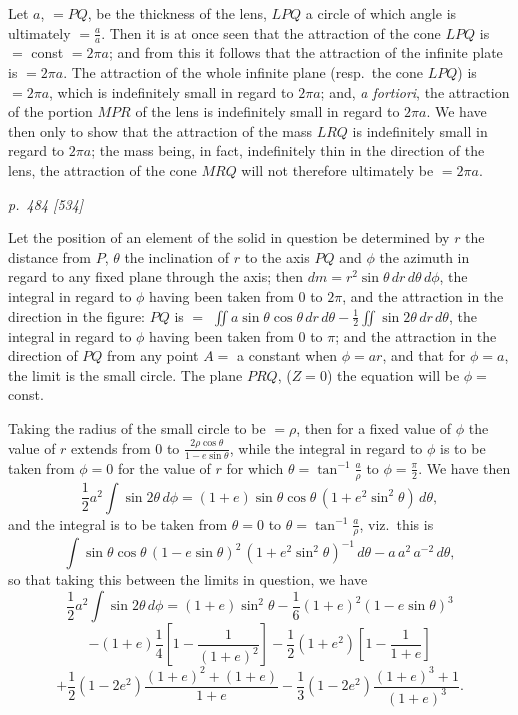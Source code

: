 \documentclass[11pt,a4paper]{book}
\begin{document}
Let $a$, $=PQ$, be the thickness of the lens, $LPQ$ a circle of which angle is ultimately
$=\frac{a}{a}$. Then it is at once seen that the attraction of the cone $LPQ$ is $=$ const $= 2\pi a$;
and from this it follows that the attraction of the infinite plate is $=2\pi a$. The
attraction of the whole infinite plane (resp.\ the cone $LPQ$) is $=2\pi a$, which is
indefinitely small in regard to $2\pi a$; and, \textit{a fortiori}, the attraction of the portion $MPR$
of the lens is indefinitely small in regard to $2\pi a$. We have then only to show that
the attraction of the mass $LRQ$ is indefinitely small in regard to $2\pi a$; the mass being,
in fact, indefinitely thin in the direction of the lens, the attraction of the cone $MRQ$
will not therefore ultimately be $=2\pi a$.

\clearpage

\bigskip
\textit{p.~484 [534]}
\smallskip

\noindent
Let the position of an element of the solid in question be determined by $r$ the
distance from $P$, $\theta$ the inclination of $r$ to the axis $PQ$ and $\phi$ the azimuth in regard
to any fixed plane through the axis; then $dm = r^2 \sin\theta\,dr\,d\theta\,d\phi$, the integral
in regard to $\phi$ having been taken from $0$ to $2\pi$, and the attraction in the direction
in the figure: $PQ$ is $=$ $\iint a\sin\theta\cos\theta\,dr\,d\theta - \frac{1}{2}\iint\sin 2\theta\,dr\,d\theta$, the integral
in regard to $\phi$ having been taken from $0$ to $\pi$; and the attraction in the direction
of $PQ$ from any point $A = $ a constant when $\phi = ar$, and that for $\phi = a$, the limit is
the small circle. The plane $PRQ$, ($Z=0$) the equation will be $\phi = $ const.

Taking the radius of the small circle to be $=\rho$, then for a fixed value of $\phi$ the value of
$r$ extends from $0$ to $\frac{2\rho\cos\theta}{1 - e\sin\theta}$, while the integral in regard to $\phi$ is to be taken from
$\phi = 0$ for the value of $r$ for which $\theta = \tan^{-1}\frac{a}{\rho}$ to $\phi = \frac{\pi}{2}$. We have then
\[
\frac{1}{2}a^2\int\sin 2\theta\,d\phi = (1 + e)\sin\theta\cos\theta\,(1 + e^2\sin^2\theta)\,d\theta,
\]
and the integral is to be taken from $\theta = 0$ to $\theta = \tan^{-1}\frac{a}{\rho}$, viz.\ this is
\[
\int\sin\theta\cos\theta\,(1 - e\sin\theta)^2\,(1 + e^2\sin^2\theta)^{-1}\,d\theta - a\,a^2\,a^{-2}\,d\theta,
\]
so that taking this between the limits in question, we have
\[
\frac{1}{2}a^2\int\sin 2\theta\,d\phi = (1 + e)\sin^2\theta - \frac{1}{6}(1+ e)^2(1 - e\sin\theta)^3
\]
\[
- (1 + e)\frac{1}{4}\left[1 - \frac{1}{(1+e)^2}\right] - \frac{1}{2}(1 + e^2)\left[1 - \frac{1}{1+e}\right]
\]
\[
+ \frac{1}{2}(1 - 2e^2)\frac{(1+e)^2 + (1+e)}{1+e} - \frac{1}{3}(1-2e^2)\frac{(1+e)^3 + 1}{(1+e)^3}.
\]
\end{document}
